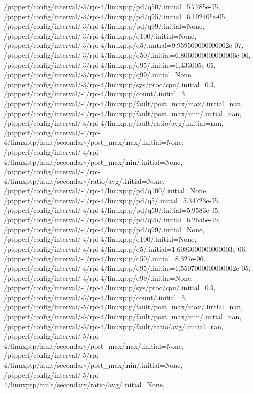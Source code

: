 {    /ptpperf/config/interval/-3/rpi-4/linuxptp/pd/q50/.initial=5.7785e-05,
    /ptpperf/config/interval/-3/rpi-4/linuxptp/pd/q95/.initial=6.192405e-05,
    /ptpperf/config/interval/-3/rpi-4/linuxptp/pd/q99/.initial=None,
    /ptpperf/config/interval/-3/rpi-4/linuxptp/q100/.initial=None,
    /ptpperf/config/interval/-3/rpi-4/linuxptp/q5/.initial=9.959500000000002e-07,
    /ptpperf/config/interval/-3/rpi-4/linuxptp/q50/.initial=6.8060000000000006e-06,
    /ptpperf/config/interval/-3/rpi-4/linuxptp/q95/.initial=1.433005e-05,
    /ptpperf/config/interval/-3/rpi-4/linuxptp/q99/.initial=None,
    /ptpperf/config/interval/-3/rpi-4/linuxptp/sys/proc/cpu/.initial=0.0,
    /ptpperf/config/interval/-4/rpi-4/linuxptp/count/.initial=3,
    /ptpperf/config/interval/-4/rpi-4/linuxptp/fault/post_max/max/.initial=nan,
    /ptpperf/config/interval/-4/rpi-4/linuxptp/fault/post_max/min/.initial=nan,
    /ptpperf/config/interval/-4/rpi-4/linuxptp/fault/ratio/avg/.initial=nan,
    /ptpperf/config/interval/-4/rpi-4/linuxptp/fault/secondary/post_max/max/.initial=None,
    /ptpperf/config/interval/-4/rpi-4/linuxptp/fault/secondary/post_max/min/.initial=None,
    /ptpperf/config/interval/-4/rpi-4/linuxptp/fault/secondary/ratio/avg/.initial=None,
    /ptpperf/config/interval/-4/rpi-4/linuxptp/pd/q100/.initial=None,
    /ptpperf/config/interval/-4/rpi-4/linuxptp/pd/q5/.initial=5.34723e-05,
    /ptpperf/config/interval/-4/rpi-4/linuxptp/pd/q50/.initial=5.9583e-05,
    /ptpperf/config/interval/-4/rpi-4/linuxptp/pd/q95/.initial=6.2656e-05,
    /ptpperf/config/interval/-4/rpi-4/linuxptp/pd/q99/.initial=None,
    /ptpperf/config/interval/-4/rpi-4/linuxptp/q100/.initial=None,
    /ptpperf/config/interval/-4/rpi-4/linuxptp/q5/.initial=1.6083000000000003e-06,
    /ptpperf/config/interval/-4/rpi-4/linuxptp/q50/.initial=8.327e-06,
    /ptpperf/config/interval/-4/rpi-4/linuxptp/q95/.initial=1.5507000000000002e-05,
    /ptpperf/config/interval/-4/rpi-4/linuxptp/q99/.initial=None,
    /ptpperf/config/interval/-4/rpi-4/linuxptp/sys/proc/cpu/.initial=0.0,
    /ptpperf/config/interval/-5/rpi-4/linuxptp/count/.initial=3,
    /ptpperf/config/interval/-5/rpi-4/linuxptp/fault/post_max/max/.initial=nan,
    /ptpperf/config/interval/-5/rpi-4/linuxptp/fault/post_max/min/.initial=nan,
    /ptpperf/config/interval/-5/rpi-4/linuxptp/fault/ratio/avg/.initial=nan,
    /ptpperf/config/interval/-5/rpi-4/linuxptp/fault/secondary/post_max/max/.initial=None,
    /ptpperf/config/interval/-5/rpi-4/linuxptp/fault/secondary/post_max/min/.initial=None,
    /ptpperf/config/interval/-5/rpi-4/linuxptp/fault/secondary/ratio/avg/.initial=None,
}
